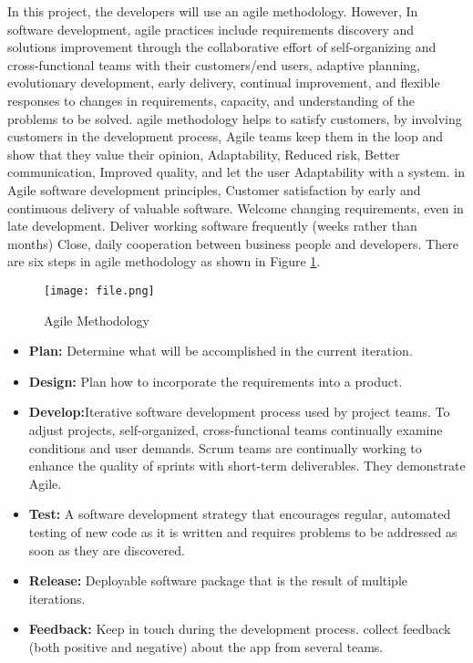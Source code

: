 \documentclass[11pt]{article}
\newcommand\tab[1][1cm]{\hspace*{#1}}
\begin{document}
\tab In this project, the developers will use an agile methodology. However, In software development, agile practices include requirements discovery and solutions improvement through the collaborative effort of self-organizing and cross-functional teams with their customers/end users, adaptive planning, evolutionary development, early delivery, continual improvement, and flexible responses to changes in requirements, capacity, and understanding of the problems to be solved. agile methodology helps to satisfy customers, by involving customers in the development process, Agile teams keep them in the loop and show that they value their opinion, Adaptability, Reduced risk, Better communication, Improved quality, and let the user Adaptability with a system. in Agile software development principles, Customer satisfaction by early and continuous delivery of valuable software. Welcome changing requirements, even in late development. Deliver working software frequently (weeks rather than months) Close, daily cooperation between business people and developers. There are six steps in agile methodology as shown in Figure \ref{fig:Agile}.
\begin{figure} [h]
\begin{center}
\texttt{[image: file.png]}
\end{center}
\caption{Agile Methodology}
  \label{fig:Agile}
\end{figure}

\begin{itemize}
\item \textbf{Plan:} Determine what will be accomplished in the current iteration.
\item \textbf{Design:} Plan how to incorporate the requirements into a product.
\item \textbf{Develop:}Iterative software development process used by project teams. To adjust projects, self-organized, cross-functional teams continually examine conditions and user demands. Scrum teams are continually working to enhance the quality of sprints with short-term deliverables. They demonstrate Agile.
\item \textbf{Test: }
A software development strategy that encourages regular, automated testing of new code as it is written and requires problems to be addressed as soon as they are discovered.
\item \textbf{Release:}
Deployable software package that is the result of multiple iterations.
\item \textbf{Feedback: }
Keep in touch during the development process. collect feedback (both positive and negative) about the app from several teams.
\end{itemize}
\end{document}

